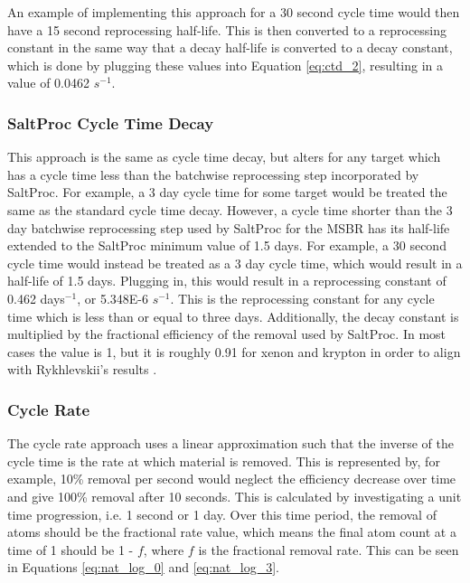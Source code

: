 An example of implementing this approach for a 30 second cycle time would then have a 15 second reprocessing half-life. This is then converted to a reprocessing constant in the same way that a decay half-life is converted to a decay constant, which is done by plugging these values into Equation \eqref{eq:ctd_2}, resulting in a value of 0.0462 $s^{-1}$.


\subsubsection{SaltProc Cycle Time Decay}

This approach is the same as cycle time decay, but alters for any target which has a cycle time less than the batchwise reprocessing step incorporated by SaltProc. For example, a 3 day cycle time for some target would be treated the same as the standard cycle time decay. However, a cycle time shorter than the 3 day batchwise reprocessing step used by SaltProc for the MSBR has its half-life extended to the SaltProc minimum value of 1.5 days. For example, a 30 second cycle time would instead be treated as a 3 day cycle time, which would result in a half-life of 1.5 days. Plugging in, this would result in a reprocessing constant of 0.462 days$^{-1}$, or 5.348E-6 $s^{-1}$. This is the reprocessing constant for any cycle time which is less than or equal to three days. Additionally, the decay constant is multiplied by the fractional efficiency of the removal used by SaltProc. In most cases the value is 1, but it is roughly 0.91 for xenon and krypton in order to align with Rykhlevskii's results \cite{rykhlevskii_fuel_2020}.

\subsubsection{Cycle Rate}
\label{s:CR}

The cycle rate approach uses a linear approximation such that the inverse of the cycle time is the rate at which material is removed. This is represented by, for example, 10\% removal per second would neglect the efficiency decrease over time and give 100\% removal after 10 seconds. This is calculated by investigating a unit time progression, i.e. 1 second or 1 day. Over this time period, the removal of atoms should be the fractional rate value, which means the final atom count at a time of 1 should be 1 - $f$, where $f$ is the fractional removal rate. This can be seen in Equations \eqref{eq:nat_log_0} and \eqref{eq:nat_log_3}.

